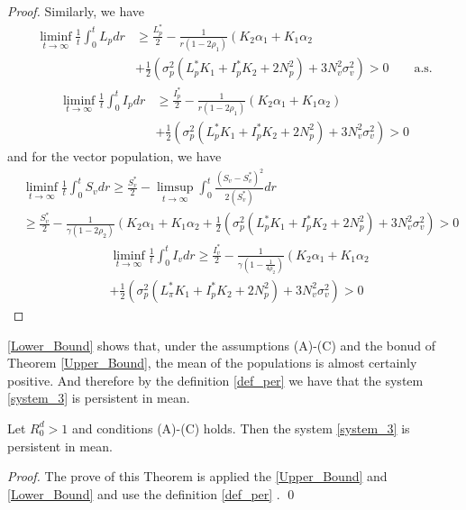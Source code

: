 \begin{proof}
	Similarly, we have
	\begin{align*}
	 	\liminf
	 	\limits_{t \to \infty}
	 	\frac{1}{t}\int_{0}^{t} L_p dr
	 	&\geq
	 	\frac{L_p^*}{2} - 
	 	\frac{1}{ r(1 - 2 \rho_1)}
	 	\left(
	 		K_2 \alpha_1 + 
	 		K_1 \alpha_2
	 	\right.
	 	\\
	 	&+
	 	\frac{1}{2}
	 	\left(
	 		\sigma_p^2(
	 			L_p ^ *K_1 + 
	 			I_p ^* K_2 + 
	 			2 N_p ^ 2
	 		) + 
	 		3 N_v ^ 2 \sigma_v ^ 2
	 	\right)
	 	>0 \qquad\mbox{a.s.}
	\end{align*}
	\begin{align*}
	 	\liminf
	 	\limits_{t \to \infty}
	 	\frac{1}{t}
	 	\int_{0} ^ {t} I_p dr
	 	&
	 	\geq
	 	\frac{I_p ^ *}{2} - 
	 	\frac{1}{ r (1 - 2 \rho_1)}
	 	\left(
	 		K_2 \alpha_1 + 
	 		K_1 \alpha_2 
	 	\right)
	 	\\
 		&+
 		\frac{1}{2}
 		\left(
 			\sigma_p ^ 2
 			(
 				L_p ^* K_1 + 
 				I_p ^* K_2 + 
 				2 N_p ^ 2
 			) + 
 			3 N_v ^ 2
 			\sigma_v ^ 2
 		\right)>0
	\end{align*}
	and for the vector population, we have
	\begin{align*}
	 	&
	 	\liminf
	 	\limits_{t \to \infty}
	 	\frac{1}{t}
	 	\int_{0} ^ {t} 
	 		S_v 
	 	dr
	 	\geq
	 	\frac{S_v^*}{2}
	 	-
	 	\limsup_{t\to \infty}
	 	\int_{0} ^ {t}
	 	\frac{(S_v - S_v^*) ^ 2}{2 (S_v ^* )}dr
	 	\\
	 	&\geq
	 	\frac{S_v ^* }{2} - 
	 	\frac{1}{\gamma(1-2\rho_2)}
	 	\left(
	 		K_2 \alpha_1 + 
	 		K_1 \alpha_2
	 	\right.+
 		\frac{1}{2}
 		\left(
 			\sigma_p^2
 			(
 				L_p ^* K_1 + 
 				I_p ^* K_2 + 
 				2N_p ^2
 			) + 
 			3N_v ^ 2
 			\sigma_v ^ 2
 		\right) >0
	\end{align*}
%
 \begin{align*}
	 	&
	 	\liminf\limits_{t \to \infty}
	 	\frac{1}{t}\int_{0}^{t} I_v dr
	 	\geq
 		\frac{I_v^*}{2} - 
 		\frac{1}{
 			\gamma
 			(
 				1 - 
 				\frac{1}{4\rho_2}
 			)}
 		\left(
 			K_2 \alpha_1 + 
 			K_1 \alpha_2
 		\right.\\
	 	&+
	 	\frac{1}{2}
	 	\left(
	 		\sigma_p ^ 2
	 		(
	 			L_\pi ^* K_1 + 
	 			I_p ^ *K_2 + 
	 			2N_p ^ 2
	 		) + 
	 		3N_v ^ 2
	 		\sigma_v ^ 2
	 	\right)
	 	>0
 \end{align*}
\end{proof}
%
\begin{remark}
	\autoref{Lower_Bound} shows that, under the assumptions (A)-(C)
	and the bonud of Theorem \ref{Upper_Bound}, the mean of the 
	populations is almost certainly positive. And therefore by the 
	definition \ref{def_per} we have that the system 
	\eqref{system_3} is persistent in mean.
\end{remark}
%
\begin{theorem}
	Let $R^d_0>1$ and conditions (A)-(C) holds. 
	Then the system \eqref{system_3} is persistent in mean.
\end{theorem}
\begin{proof}
	The prove of this Theorem is applied the
	\autoref{Upper_Bound} and 
	\ref{Lower_Bound} and use the definition \ref{def_per} .
	\qed
\end{proof}
